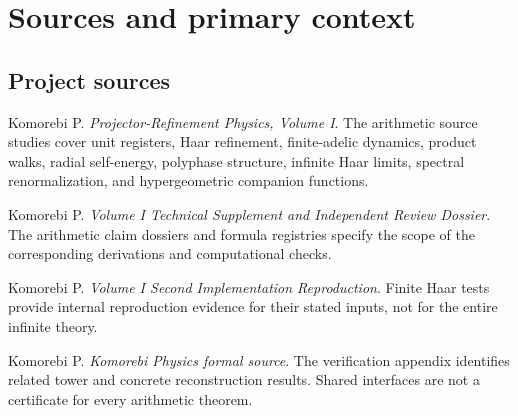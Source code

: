 \clearpage
\section*{Sources and primary context}
\subsection*{Project sources}
\begin{enumerate}[label={[S\arabic*]},leftmargin=2.5em]
\item Komorebi P. \emph{Projector-Refinement Physics, Volume I}. The arithmetic source studies cover unit registers, Haar refinement, finite-adelic dynamics, product walks, radial self-energy, polyphase structure, infinite Haar limits, spectral renormalization, and hypergeometric companion functions.
\item Komorebi P. \emph{Volume I Technical Supplement and Independent Review Dossier}. The arithmetic claim dossiers and formula registries specify the scope of the corresponding derivations and computational checks.
\item Komorebi P. \emph{Volume I Second Implementation Reproduction}. Finite Haar tests provide internal reproduction evidence for their stated inputs, not for the entire infinite theory.
\item Komorebi P. \emph{Komorebi Physics formal source}. The verification appendix identifies related tower and concrete reconstruction results. Shared interfaces are not a certificate for every arithmetic theorem.
\end{enumerate}

